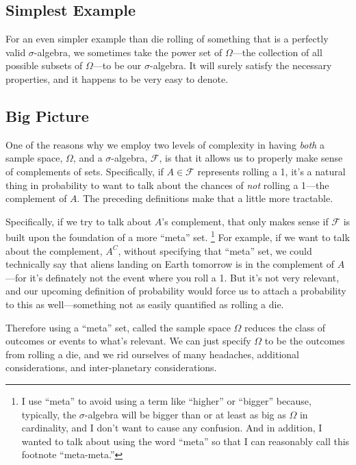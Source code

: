 \documentclass[a4paper,12pt]{article}
\theoremstyle{plain}
\theoremstyle{definition}
\theoremstyle{remark}
\begin{document}
\subsection{Simplest Example}

For an even simpler example than die rolling of something that is
a perfectly valid $\sigma$-algebra, we
sometimes take the power set of $\Omega$---the collection of all
possible subsets of $\Omega$---to be our $\sigma$-algebra.  It will
surely satisfy the necessary properties, and it happens to be very easy
to denote.

\subsection{Big Picture}

One of the reasons why we employ two levels of complexity in having
\emph{both} a sample space, $\Omega$,
and a $\sigma$-algebra, $\mathcal{F}$, is that it allows us to
properly make sense of complements of sets.  Specifically, if $A \in
\mathcal{F}$ represents rolling a 1, it's a natural thing in
probability to want to talk about the chances of \emph{not} rolling
a 1---the complement of $A$. The preceding definitions make that a
little more tractable.

Specifically, if we try to talk about $A$'s complement, that only
makes sense if $\mathcal{F}$ is built upon the foundation of a
more ``meta'' set. \footnote{I use ``meta'' to avoid using a term
like ``higher'' or ``bigger'' because, typically, the $\sigma$-algebra
will be bigger than or at least as big as $\Omega$ in cardinality,
and I don't want to cause any confusion. And
in addition, I wanted to talk about using the word ``meta'' so that
I can reasonably call this footnote ``meta-meta.''}
For example, if we want to talk about
the complement, $A^C$, without specifying that ``meta'' set, we could
technically say that aliens landing on Earth tomorrow is in the
complement of $A$---for it's definately not the event where you
roll a 1. But it's not very relevant, and our upcoming definition of
probability would force us to attach a probability to this as
well---something not as easily quantified as rolling a die.

Therefore using a ``meta'' set, called the sample space $\Omega$
reduces the class of outcomes or events to what's relevant. We can
just specify $\Omega$ to be the outcomes from rolling a die, and we
rid ourselves of many headaches, additional considerations, and
inter-planetary considerations.
\end{document}
